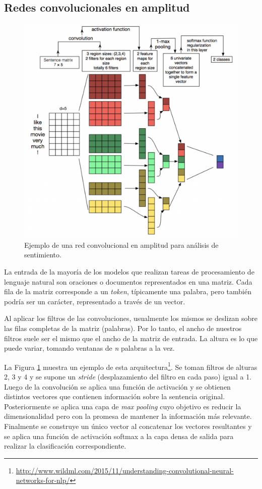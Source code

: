 \subsection{Redes convolucionales en amplitud}\label{sec:cnn:wide}

\begin{figure}[ht!]
\begin{center}
\includegraphics[width=.9\linewidth]{images/CNN_wide_NLP.png}
\caption{Ejemplo de una red convolucional en amplitud para análisis de sentimiento.}
\label{fig:CNN_wide_architecture}
\end{center}
\end{figure}

La entrada de la mayoría de los modelos que realizan tareas de procesamiento de lenguaje natural son oraciones o documentos representados en una matriz. Cada fila de la matriz corresponde a un \textit{token}, típicamente una palabra, pero también podría ser un carácter, representado a través de un vector.

Al aplicar los filtros de las convoluciones, usualmente los mismos se deslizan sobre las filas completas de la matriz (palabras). Por lo tanto, el ancho de nuestros filtros suele ser el mismo que el ancho de la matriz de entrada. La altura es lo que puede variar, tomando ventanas de \textit{n} palabras a la vez.

La Figura \ref{fig:CNN_wide_architecture} muestra un ejemplo de esta arquitectura\footnote{\url{http://www.wildml.com/2015/11/understanding-convolutional-neural-networks-for-nlp/}}. Se toman filtros de alturas 2, 3 y 4 y se supone un \textit{stride} (desplazamiento del filtro en cada paso) igual a 1. Luego de la convolución se aplica una función de activación y se obtienen distintos vectores que contienen información sobre la sentencia original. Posteriormente se aplica una capa de \textit{max pooling} cuyo objetivo es reducir la dimensionalidad pero con la promesa de mantener la información más relevante. Finalmente se construye un único vector al concatenar los vectores resultantes y se aplica una función de activación softmax a la capa densa de salida para realizar la clasificación correspondiente.

